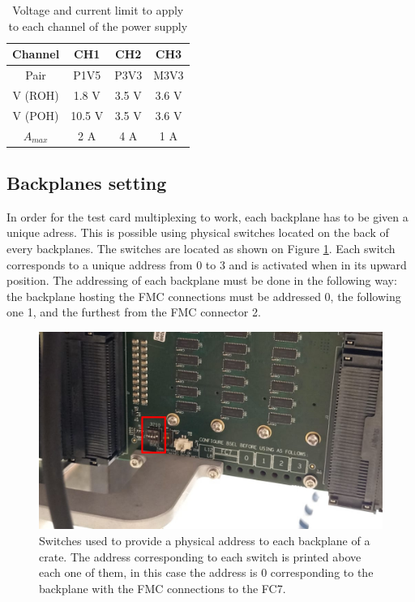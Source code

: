 \documentclass[10pt,a4paper]{article}
\begin{document}
\begin{table}[h!]
\centering
\begin{tabular}{|c|c|c|c|}
\hline 
Channel & CH1 & CH2 & CH3 \\ 
\hline 
Pair & P1V5 & P3V3 & M3V3 \\ 
\hline 
V (ROH)& 1.8 V & 3.5 V & 3.6 V \\
V (POH)& 10.5 V & 3.5 V & 3.6 V \\
$A_{max}$ & 2 A & 4 A & 1 A \\ 
\hline 
\end{tabular} 
\label{tableIV}
\caption{Voltage and current limit to apply to each channel of the power supply}
\end{table}

\subsection{Backplanes setting}
In order for the test card multiplexing to work, each backplane has to be given a unique adress. This is possible using physical switches located on the back of every backplanes. The switches are located as shown on Figure \ref{BackPlaneSwitch}. Each switch corresponds to a unique address from 0 to 3 and is activated when in its upward position. The addressing of each backplane must be done in the following way: the backplane hosting the FMC connections must be addressed 0, the following one 1, and the furthest from the FMC connector 2.

\begin{figure}[h!]
 \includegraphics[width=\linewidth]{BackPlaneSwitch.jpeg} 
  \caption{Switches used to provide a physical address to each backplane of a crate. The address corresponding to each switch is printed above each one of them, in this case the address is 0 corresponding to the backplane with the FMC connections to the FC7.}
  \label{BackPlaneSwitch}
\end{figure}
\end{document}
